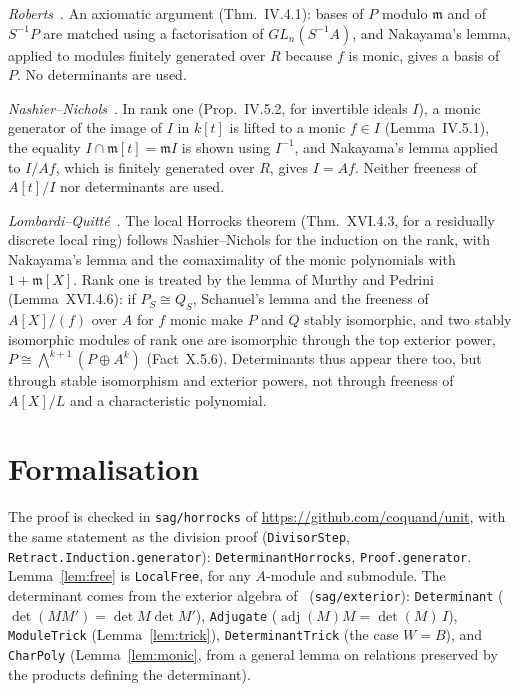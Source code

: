 \documentclass[11pt]{amsart}
\theoremstyle{remark}
\begin{document}
\emph{Roberts}~\cite[\S IV.4]{Lam}. An axiomatic argument
(Thm.~IV.4.1): bases of $P$ modulo $\mathfrak m$ and of $S^{-1}P$ are matched
using a factorisation of $GL_n(S^{-1}A)$, and Nakayama's lemma, applied to
modules finitely generated over $R$ because $f$ is monic, gives a basis of
$P$. No determinants are used.

\emph{Nashier--Nichols}~\cite[\S IV.5]{Lam}. In rank one
(Prop.~IV.5.2, for invertible ideals $I$), a monic generator of the image of
$I$ in $k[t]$ is lifted to a monic $f\in I$ (Lemma~IV.5.1), the equality
$I\cap\mathfrak m[t]=\mathfrak mI$ is shown using $I^{-1}$, and Nakayama's
lemma applied to $I/Af$, which is finitely generated over $R$, gives
$I=Af$. Neither freeness of $A[t]/I$ nor determinants are used.

\emph{Lombardi--Quitt\'e}~\cite[\S XVI.4]{LQ}. The local Horrocks theorem
(Thm.~XVI.4.3, for a residually discrete local ring) follows
Nashier--Nichols for the induction on the rank, with Nakayama's lemma and the
comaximality of the monic polynomials with $1+\mathfrak m[X]$. Rank one is
treated by the lemma of Murthy and Pedrini (Lemma~XVI.4.6): if $P_S\cong Q_S$,
Schanuel's lemma and the freeness of $A[X]/(f)$ over $A$ for $f$ monic make
$P$ and $Q$ stably isomorphic, and two stably isomorphic modules of rank one
are isomorphic through the top exterior power,
$P\cong\bigwedge^{k+1}(P\oplus A^k)$ (Fact~X.5.6). Determinants thus appear
there too, but through stable isomorphism and exterior powers, not through
freeness of $A[X]/L$ and a characteristic polynomial.

\section{Formalisation}

\begin{sloppypar}
The proof is checked in \texttt{sag/horrocks} of \url{https://github.com/coquand/unit}, with the same
statement as the division proof (\texttt{DivisorStep},
\texttt{Retract.Induction.generator}): \texttt{DeterminantHorrocks},
\texttt{Proof.generator}. Lemma~\ref{lem:free} is \texttt{LocalFree}, for any
$A$-module and submodule. The determinant comes from the exterior algebra
of~\cite{CQ} (\texttt{sag/exterior}): \texttt{Determinant}
($\det(MM')=\det M\det M'$), \texttt{Adjugate}
($\operatorname{adj}(M)M=\det(M)\,I$), \texttt{ModuleTrick}
(Lemma~\ref{lem:trick}), \texttt{DeterminantTrick} (the case $W=B$), and
\texttt{CharPoly} (Lemma~\ref{lem:monic}, from a general lemma on relations
preserved by the products defining the determinant).
\end{sloppypar}
\end{document}
